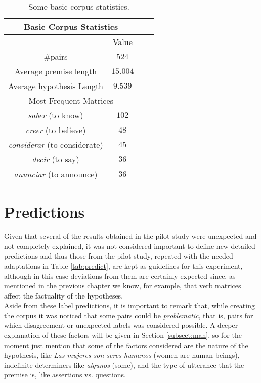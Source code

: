 \begin{table}
\centering
\begin{tabular}{|c|c|c|c|}
\hline
\multicolumn{2}{|c|}{Basic Corpus Statistics}\\\hline
                      & Value\\\hline 
\#pairs & $524$ \\\hline
Average premise length &$15.004$\\\hline
Average hypothesis Length & $9.539$\\\hline
\multicolumn{2}{|c|}{Most Frequent Matrices}\\\hline
\textit{saber} (to know)  & $102$\\\hline
\textit{creer} (to believe) & $48$\\\hline
\textit{considerar} (to considerate) & $45$\\\hline
\textit{decir}  (to say) & $36$\\\hline
\textit{anunciar} (to announce) & $36$\\\hline
\end{tabular}
\caption{Some basic corpus statistics.}\label{tab:corstats}
\label{tab:basstats}
\end{table}

\section{Predictions}
\label{sect:pred}
Given that several of the results obtained in the pilot study were unexpected and not completely explained, it was not considered important to define new detailed predictions and thus those from the pilot study, repeated with the needed adaptations in Table \ref{tab:predict}, are kept as guidelines for this experiment, although in this case deviations from them are certainly expected since, as mentioned in the previous chapter we know, for example, that verb matrices affect the factuality of the hypotheses.\\ 

Aside from these label predictions, it is important to remark that, while creating the corpus it was noticed that some pairs could be \textit{problematic}, that is, pairs for which disagreement or unexpected labels was considered possible. A deeper explanation of these factors will be given in Section \ref{subsect:man}, so for the moment just mention that some of the factors considered are the nature of the hypothesis, like \textit{Las mujeres son seres humanos} (women are human beings), indefinite determiners like \textit{algunos} (some), and the type of utterance that the premise is, like assertions vs. questions.\\

